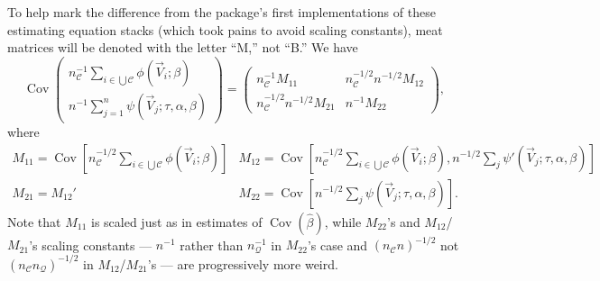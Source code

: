 \documentclass{article}
\begin{document}
To help mark the difference from the package's first implementations of these estimating equation stacks (which took pains to avoid scaling constants), 
meat matrices will be denoted with the letter ``M,'' not ``B.''
We have
\[
\operatorname{Cov}\left(
     \begin{array}{c}
       n_{\mathcal{C}}^{-1}\sum_{i\in \bigcup \mathcal{C}}\phi(\vec{V}_{i}; \beta )\\
       n^{-1}\sum_{j=1}^{n}\psi(\vec{V}_{j}; \tau, \alpha, \beta )
     \end{array}
\right) = \left(
  \begin{array}{cc}
    n_{\mathcal{C}}^{-1}M_{11}& n_{\mathcal{C}}^{-1/2}n^{-1/2} M_{12}\\
    n_{\mathcal{C}}^{-1/2}n^{-1/2} M_{21} & n^{-1}M_{22}
  \end{array}
\right),
\]
where
\[
  \begin{array}{cc}
    M_{11}  = \operatorname{Cov}[n_{\mathcal{C}}^{-1/2}\sum_{i\in \bigcup
             \mathcal{C}} \phi(\vec{V}_{i}; \beta )] &
                                                                  M_{12}=
                                                                  \operatorname{Cov}[n_{\mathcal{C}}^{-1/2}\sum_{i\in \bigcup
             \mathcal{C}}\phi(\vec{V}_{i};
                                                                  \beta
                                                                  ), n^{-1/2}\sum_{j}\psi'(\vec{V}_{j}; \tau, \alpha, \beta )]\\
    M_{21}=M_{12}' & M_{22} = \operatorname{Cov}[n^{-1/2}\sum_{j}\psi(\vec{V}_{j};
                     \tau, \alpha, \beta )] .
    \end{array}
\]
Note that $M_{11}$ is scaled just as in estimates of $\operatorname{Cov}(\hat\beta)$, while $M_{22}$'s and
$M_{12}$/$M_{21}$'s scaling constants --- $n^{-1}$ rather than
$n_{\mathcal{Q}}^{-1}$ in $M_{22}$'s
case and $(n_{\mathcal{C}}n)^{-1/2}$ not $(n_{\mathcal{C}} n_{\mathcal{Q}})^{-1/2}$ in $M_{12}$/$M_{21}$'s --- are progressively more weird.
\end{document}
